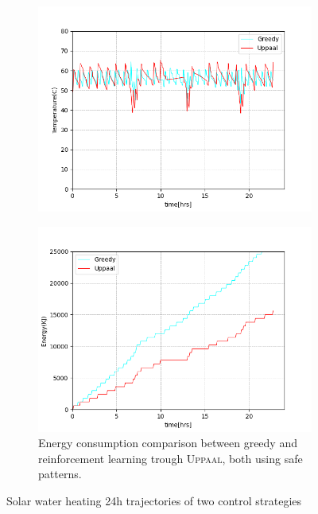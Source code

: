         \begin{figure}[!htb]        
          \begin{subfigure}{0.51\textwidth}
            \includegraphics[width=1.0\linewidth]{images/controllers1.png}
            \captionsetup{format=hang}
             \label{fig:resulta}
          \end{subfigure}
          \hspace*{\fill}
          \begin{subfigure}{0.51\textwidth}
              \includegraphics[width=1.0\linewidth]{images/energycomparison.png}
              \captionsetup{format=hang}
              \caption{Energy consumption comparison between greedy and reinforcement
              learning trough \textsc{Uppaal}, both using safe patterns.} \label{fig:resultb}
          \end{subfigure}%
          \caption{Solar water heating 24h trajectories of two control strategies}
        \end{figure}

